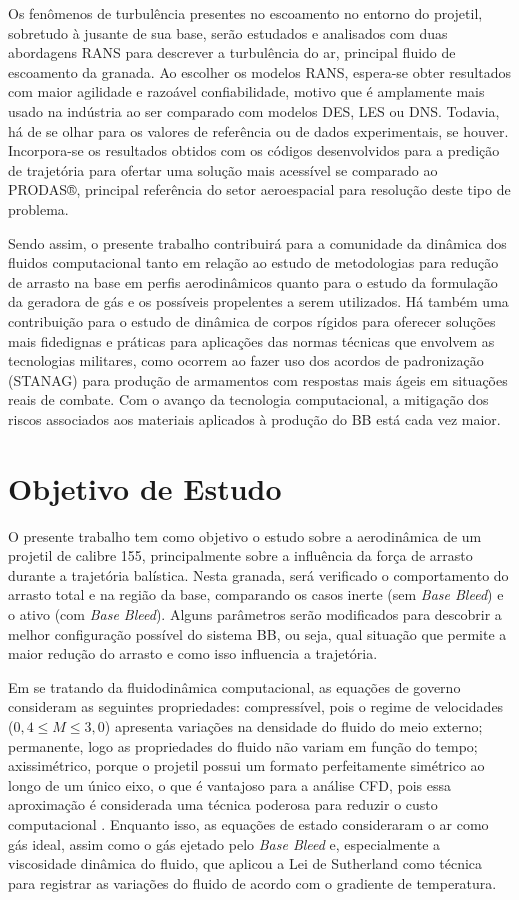 Os fenômenos de turbulência presentes no escoamento no entorno do projetil, sobretudo à jusante de sua base, serão estudados e analisados com duas abordagens RANS para descrever a turbulência do ar, principal fluido de escoamento da granada. Ao escolher os modelos RANS, espera-se obter resultados com maior agilidade e razoável confiabilidade, motivo que é amplamente mais usado na indústria ao ser comparado com modelos DES, LES ou DNS. Todavia, há de se olhar para os valores de referência ou de dados experimentais, se houver. Incorpora-se os resultados obtidos com os códigos desenvolvidos para a predição de trajetória para ofertar uma solução mais acessível se comparado ao PRODAS®, principal referência do setor aeroespacial para resolução deste tipo de problema.

Sendo assim, o presente trabalho contribuirá para a comunidade da dinâmica dos fluidos computacional tanto em relação ao estudo de metodologias para redução de arrasto na base em perfis aerodinâmicos quanto para o estudo da formulação da geradora de gás e os possíveis propelentes a serem utilizados. Há também uma contribuição para o estudo de dinâmica de corpos rígidos para oferecer soluções mais fidedignas e práticas para aplicações das normas técnicas que envolvem as tecnologias militares, como ocorrem ao fazer uso dos acordos de padronização (STANAG) para produção de armamentos com respostas mais ágeis em situações reais de combate. Com o avanço da tecnologia computacional, a mitigação dos riscos associados aos materiais aplicados à produção do BB está cada vez maior. 

\section{Objetivo de Estudo}

O presente trabalho tem como objetivo o estudo sobre a aerodinâmica de um projetil de calibre \qty{155}{\millimetre}, principalmente sobre a influência da força de arrasto durante a trajetória balística. Nesta granada, será verificado o comportamento do arrasto total e na região da base, comparando os casos inerte (sem \textit{Base Bleed}) e o ativo (com \textit{Base Bleed}). Alguns parâmetros serão modificados para descobrir a melhor configuração possível do sistema BB, ou seja, qual situação que permite a maior redução do arrasto e como isso influencia a trajetória.
	
Em se tratando da fluidodinâmica computacional, as equações de governo consideram as seguintes propriedades: compressível, pois o regime de velocidades ($0,4 \leq M \leq 3,0$) apresenta variações na densidade do fluido do meio externo; permanente, logo as propriedades do fluido não variam em função do tempo; axissimétrico, porque o projetil possui um formato perfeitamente simétrico ao longo de um único eixo, o que é vantajoso para a análise CFD, pois essa aproximação é considerada uma técnica poderosa para reduzir o custo computacional \cite{Lucena2020}. Enquanto isso, as equações de estado consideraram o ar como gás ideal, assim como o gás ejetado pelo \textit{Base Bleed} e, especialmente a viscosidade dinâmica do fluido, que aplicou a Lei de Sutherland como técnica para registrar as variações do fluido de acordo com o gradiente de temperatura.

